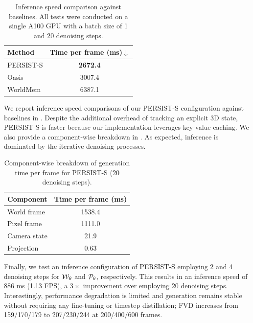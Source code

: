 \documentclass{article}
\theoremstyle{plain}
\theoremstyle{definition}
\theoremstyle{remark}
\begin{document}
\begin{table}[h]
  \centering
  \caption{Inference speed comparison against baselines. All tests were conducted on a single A100 GPU with a batch size of 1 and 20 denoising steps.}
  \setlength{\tabcolsep}{4pt}
  \begin{tabular}{lc}
  \toprule
  Method & Time per frame (ms)$\downarrow$ \\
  \midrule
  PERSIST-S & \textbf{2672.4} \\
  Oasis & 3007.4 \\
  WorldMem & 6387.1 \\
  \bottomrule
  \end{tabular}
  \label{tab:speed-baselines}
  \vspace{0.5cm}
\end{table}

We report inference speed comparisons of our PERSIST-S configuration against baselines in . Despite the additional overhead of tracking an explicit 3D state, PERSIST-S is faster because our implementation leverages key-value caching. We also provide a component-wise breakdown in . As expected, inference is dominated by the iterative denoising processes.

\begin{table}[h]
  \centering
  \caption{Component-wise breakdown of generation time per frame for PERSIST-S (20 denoising steps).}
  \setlength{\tabcolsep}{4pt}
  \begin{tabular}{lc}
  \toprule
  Component & Time per frame (ms) \\
  \midrule
  World frame & 1538.4 \\
  Pixel frame & 1111.0 \\
  Camera state & 21.9 \\
  Projection & 0.63 \\
  \bottomrule
  \end{tabular}
  \label{tab:speed-components}
  \vspace{1cm}
\end{table}

Finally, we test an inference configuration of PERSIST-S employing 2 and 4 denoising steps for ${\mathcal{W}}_\theta$ and ${\mathcal{P}}_\theta$, respectively. This results in an inference speed of 886 ms (1.13 FPS), a $3\times$ improvement over employing 20 denoising steps. Interestingly, performance degradation is limited and generation remains stable without requiring any fine-tuning or timestep distillation; FVD increases from 159/170/179 to 207/230/244 at 200/400/600 frames.
\end{document}
